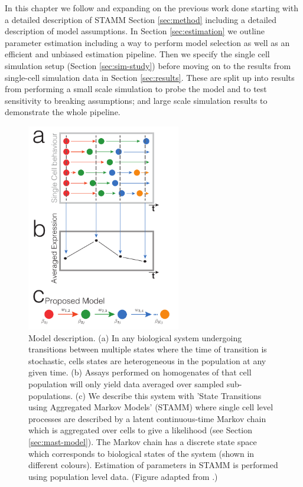 In this chapter we follow and expanding on the previous work done starting with a detailed description of STAMM Section \ref{sec:method} including a detailed description of model assumptions. In Section \ref{sec:estimation} we outline parameter estimation including a way to perform model selection as well as an efficient and unbiased estimation pipeline. Then we specify the single cell simulation setup (Section \ref{sec:sim-study})  before moving on to the results from single-cell simulation data in Section \ref{sec:results}. These are split up into results from performing a small scale simulation to probe the model and to test sensitivity to breaking assumptions; and large scale simulation results to demonstrate the whole pipeline.

\begin{figure}[!t]
  \centering
  \includegraphics[width=0.6\textwidth]{pics/model_fig.pdf}
  \caption{Model description. (a) In any biological system undergoing transitions between multiple states where the time of transition is stochastic, cells states are heterogeneous in the population at any given time.  (b) Assays performed on homogenates of that cell population will only yield data averaged over sampled sub-populations. (c) We describe this system with 'State Transitions using Aggregated Markov Models' (STAMM) where single cell level processes are described by a latent continuous-time Markov chain which is aggregated over cells to give a likelihood (see Section \ref{sec:mast-model}). The Markov chain has a discrete state space which corresponds to biological states of the system (shown in different colours). Estimation of parameters in STAMM is performed using population level data. (Figure adapted from \cite{Armond:2013}.)  }
  \label{fig:model-sketch}
\end{figure}

